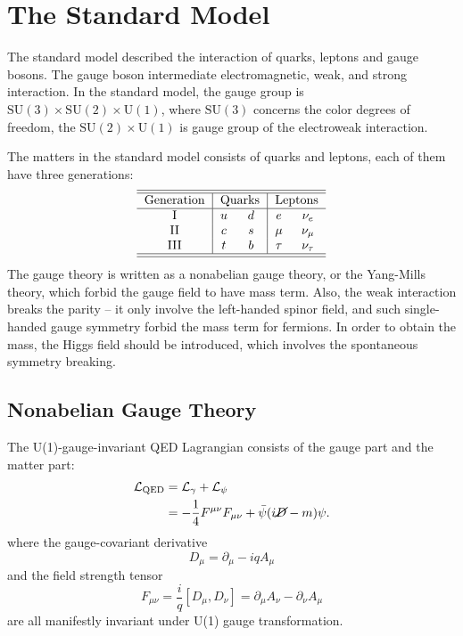 \chapter{The Standard Model}

The standard model described the interaction of quarks, leptons and gauge bosons.
The gauge boson intermediate electromagnetic, weak, and strong interaction.
In the standard model, the gauge group is $\mathrm{SU(3)}\times \mathrm{SU(2)} \times \mathrm{U(1)}$, where $\mathrm{SU(3)}$ concerns the color degrees of freedom, the $\mathrm{SU(2)}\times \mathrm{U(1)}$ is gauge group of the electroweak interaction.

The matters in the standard model consists of quarks and leptons, each of them have three generations:
\begin{equation}
	\begin{tabular}{c |c c |c c}
		\hline \hline 
		Generation & \multicolumn{2}{c|}{Quarks} & \multicolumn{2}{c}{Leptons} \\ \hline
		I & $u$ & $d$ & $e$ & $\nu_e$ \\ 
		II & $c$ & $s$ & $\mu$ & $\nu_\mu$ \\  
		III & $t$ & $b$ & $\tau$ & $\nu_\tau$ \\
		\hline \hline
	\end{tabular}
\end{equation}
The gauge theory is written as a nonabelian gauge theory, or the Yang-Mills theory, which forbid the gauge field to have mass term.
Also, the weak interaction breaks the parity -- it only involve the left-handed spinor field, and such single-handed gauge symmetry forbid the mass term for fermions.
In order to obtain the mass, the Higgs field should be introduced, which involves the spontaneous symmetry breaking.




\section{Nonabelian Gauge Theory}
The U(1)-gauge-invariant QED Lagrangian consists of the gauge part and the matter part:
\begin{equation}
\begin{aligned}
	\mathcal L_{\mathrm{QED}} &= \mathcal L_\gamma + \mathcal L_\psi \\
	&= -\frac{1}{4} F^{\mu\nu} F_{\mu\nu} + \bar\psi(i\cancel D-m)\psi.
\end{aligned}
\end{equation}
where the gauge-covariant derivative 
\begin{equation}
	D_\mu = \partial_\mu - iq A_\mu
\end{equation}
and the field strength tensor
\begin{equation}
	F_{\mu\nu} = \frac{i}{q} [D_\mu, D_\nu] = \partial_\mu A_\nu -\partial_\nu A_\mu
\end{equation}
are all manifestly invariant under U(1) gauge transformation.

